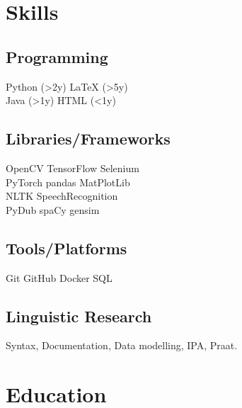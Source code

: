 \documentclass[]{plushcv}
\begin{document}
\begin{minipage}[t]{0.25\textwidth} 


\section{Skills}
\subsection{Programming}
\sectionsep
{} 
Python (>2y) \textbullet{} LaTeX (>5y)  \\
\sectionsep
{}
Java (>1y) \textbullet{}  HTML (<1y) \\
\sectionsep
\subsection{Libraries/Frameworks}
\sectionsep
OpenCV \textbullet{} TensorFlow \textbullet{} Selenium\\
PyTorch \textbullet{} pandas \textbullet{} MatPlotLib \\
NLTK \textbullet{} SpeechRecognition \textbullet{} \\ 
PyDub \textbullet{} spaCy \textbullet{} gensim
\sectionsep
\subsection{Tools/Platforms}
\sectionsep
Git \textbullet{} GitHub \textbullet{} Docker \textbullet{} SQL \\
\sectionsep
\subsection{Linguistic Research}
\sectionsep
Syntax, Documentation, Data modelling, IPA, Praat.
\sectionsep


\section{Education} 



\end{minipage}
\end{document}
